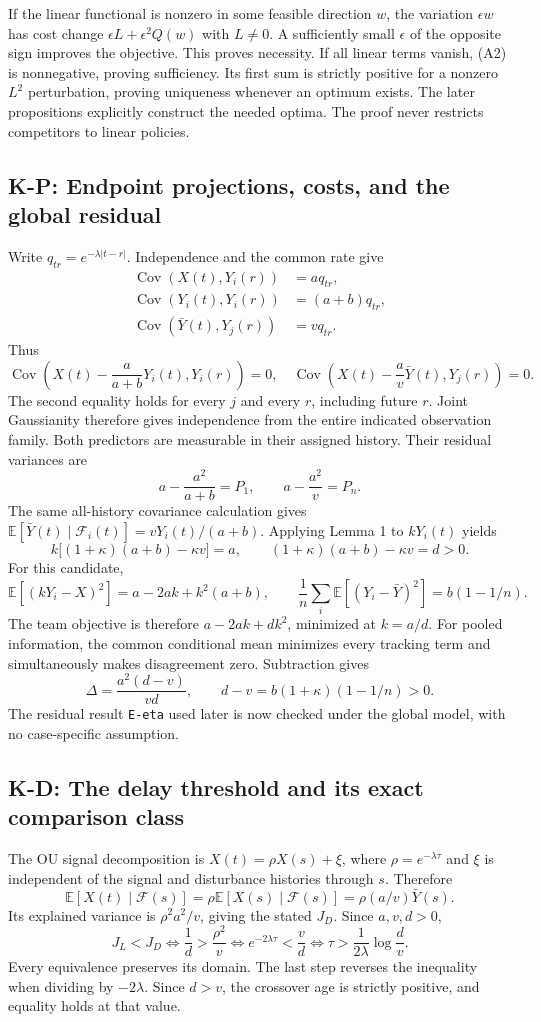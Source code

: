 \documentclass[11pt,letterpaper]{article}
\newcommand{\E}{\mathbb E}
\newcommand{\Cov}{\operatorname{Cov}}
\newcommand{\F}{\mathcal F}
\newcommand{\calculation}[2]{\subsection{#1: #2}}
\begin{document}
If the linear functional is nonzero in some feasible direction $w$, the variation $\epsilon w$ has cost change $\epsilon L+\epsilon^2Q(w)$ with $L\ne0$. A sufficiently small $\epsilon$ of the opposite sign improves the objective. This proves necessity. If all linear terms vanish, (A2) is nonnegative, proving sufficiency. Its first sum is strictly positive for a nonzero $L^2$ perturbation, proving uniqueness whenever an optimum exists. The later propositions explicitly construct the needed optima. The proof never restricts competitors to linear policies.

\calculation{K-P}{Endpoint projections, costs, and the global residual}
Write $q_{tr}=e^{-\lambda|t-r|}$. Independence and the common rate give
\begin{align*}
\Cov(X(t),Y_i(r))&=a q_{tr},\\
\Cov(Y_i(t),Y_i(r))&=(a+b)q_{tr},\\
\Cov(\bar Y(t),Y_j(r))&=v q_{tr}.
\end{align*}
Thus
\[
\Cov\left(X(t)-\frac{a}{a+b}Y_i(t),Y_i(r)\right)=0,
\quad
\Cov\left(X(t)-\frac av\bar Y(t),Y_j(r)\right)=0.
\]
The second equality holds for every $j$ and every $r$, including future $r$. Joint Gaussianity therefore gives independence from the entire indicated observation family. Both predictors are measurable in their assigned history. Their residual variances are
\[
a-\frac{a^2}{a+b}=P_1,\qquad a-\frac{a^2}{v}=P_n.
\]
The same all-history covariance calculation gives
$\E[\bar Y(t)\mid\F_i(t)]=vY_i(t)/(a+b)$. Applying Lemma 1 to $kY_i(t)$ yields
\[
k\bigl[(1+\kappa)(a+b)-\kappa v\bigr]=a,
\qquad (1+\kappa)(a+b)-\kappa v=d>0.
\]
For this candidate,
\[
\E[(kY_i-X)^2]=a-2ak+k^2(a+b),\qquad
\frac1n\sum_i\E[(Y_i-\bar Y)^2]=b(1-1/n).
\]
The team objective is therefore $a-2ak+dk^2$, minimized at $k=a/d$. For pooled information, the common conditional mean minimizes every tracking term and simultaneously makes disagreement zero. Subtraction gives
\[
\Delta=\frac{a^2(d-v)}{vd},\qquad d-v=b(1+\kappa)(1-1/n)>0.
\]
The residual result \texttt{E-eta} used later is now checked under the global model, with no case-specific assumption.

\calculation{K-D}{The delay threshold and its exact comparison class}
The OU signal decomposition is $X(t)=\rho X(s)+\xi$, where $\rho=e^{-\lambda\tau}$ and $\xi$ is independent of the signal and disturbance histories through $s$. Therefore
\[
\E[X(t)\mid\F(s)]=\rho\E[X(s)\mid\F(s)]=\rho(a/v)\bar Y(s).
\]
Its explained variance is $\rho^2a^2/v$, giving the stated $J_D$. Since $a,v,d>0$,
\[
J_L<J_D\iff \frac1d>\frac{\rho^2}{v}
\iff e^{-2\lambda\tau}<\frac vd
\iff \tau>\frac{1}{2\lambda}\log\frac dv.
\]
Every equivalence preserves its domain. The last step reverses the inequality when dividing by $-2\lambda$. Since $d>v$, the crossover age is strictly positive, and equality holds at that value.
\end{document}
